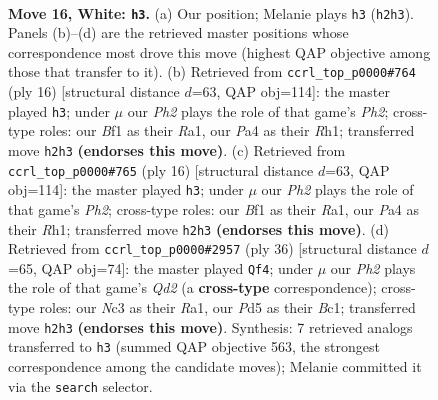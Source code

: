\documentclass[11pt]{article}
\begin{document}
\clearpage

\begin{figure}[p]\centering
\begin{subfigure}{0.46\textwidth}\centering
\resizebox{\linewidth}{!}{%
\newchessgame
\chessboard[
  setfen={rnbqkb1r/5p2/1p1p1n2/p1pP4/P3P2p/2N1BN2/RP1Q2PP/4KB1R w Kq - 1 16},
  showmover=false,
  pgfstyle=straightmove, color=movearrow, markmove={h2-h3}
]}
\caption{}
\end{subfigure}\hfill
\begin{subfigure}{0.46\textwidth}\centering
\resizebox{\linewidth}{!}{%
\newchessgame
\chessboard[
  setfen={rnbqkb1r/5p1p/p2p1np1/1ppP4/4PB2/2N2N2/PP3PPP/R2QKB1R w KQkq - 0 9},
  showmover=false,
  pgfstyle=straightmove, color=movearrow, markmove={h2-h3}
]}
\caption{}
\end{subfigure}
\\[4pt]
\begin{subfigure}{0.46\textwidth}\centering
\resizebox{\linewidth}{!}{%
\newchessgame
\chessboard[
  setfen={rnbqkb1r/5p1p/p2p1np1/1ppP4/4PB2/2N2N2/PP3PPP/R2QKB1R w KQkq - 0 9},
  showmover=false,
  pgfstyle=straightmove, color=movearrow, markmove={h2-h3}
]}
\caption{}
\end{subfigure}\hfill
\begin{subfigure}{0.46\textwidth}\centering
\resizebox{\linewidth}{!}{%
\newchessgame
\chessboard[
  setfen={rnb1k2r/2q1bppp/1p2p3/3pP3/3P3P/pB3N2/P2Q1PP1/R1B1R1K1 w kq - 1 19},
  showmover=false,
  pgfstyle=straightmove, color=movearrow, markmove={d2-f4}
]}
\caption{}
\end{subfigure}
\caption{\textbf{Move 16, White: \texttt{h3}.} (a) Our position; Melanie plays \texttt{h3} (\texttt{h2h3}). Panels (b)--(d) are the retrieved master positions whose correspondence most drove this move (highest QAP objective among those that transfer to it). (b) Retrieved from \texttt{ccrl\_top\_p0000\#764} (ply 16) [structural distance $d$=63, QAP obj=114]: the master played \texttt{h3}; under $\mu$ our \emph{Ph2} plays the role of that game's \emph{Ph2}; cross-type roles: our \emph{B}f1 as their \emph{R}a1, our \emph{P}a4 as their \emph{R}h1; transferred move \texttt{h2h3} \textbf{(endorses this move)}. (c) Retrieved from \texttt{ccrl\_top\_p0000\#765} (ply 16) [structural distance $d$=63, QAP obj=114]: the master played \texttt{h3}; under $\mu$ our \emph{Ph2} plays the role of that game's \emph{Ph2}; cross-type roles: our \emph{B}f1 as their \emph{R}a1, our \emph{P}a4 as their \emph{R}h1; transferred move \texttt{h2h3} \textbf{(endorses this move)}. (d) Retrieved from \texttt{ccrl\_top\_p0000\#2957} (ply 36) [structural distance $d$=65, QAP obj=74]: the master played \texttt{Qf4}; under $\mu$ our \emph{Ph2} plays the role of that game's \emph{Qd2} (a \textbf{cross-type} correspondence); cross-type roles: our \emph{N}c3 as their \emph{R}a1, our \emph{P}d5 as their \emph{B}c1; transferred move \texttt{h2h3} \textbf{(endorses this move)}. Synthesis: 7 retrieved analogs transferred to \texttt{h3} (summed QAP objective 563, the strongest correspondence among the candidate moves); Melanie committed it via the \texttt{search} selector.}
\label{fig:thought-m30}
\end{figure}
\end{document}
